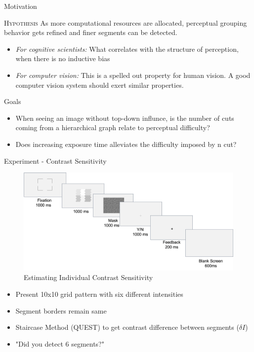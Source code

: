 \documentclass[10pt,xcolor=svgnames]{beamer} %
\begin{document}
\begin{frame}{Motivation}

\begin{exampleblock}{\textsc{Hypothesis}}
As more computational resources are allocated, perceptual grouping behavior gets refined and finer segments can be detected.
\end{exampleblock}

\begin{itemize}
    \item \textit{For cognitive scientists:} What correlates with the structure of perception, when there is no inductive bias
    \item \textit{For computer vision:} This is a spelled out property for human vision. A good computer vision system should exert similar properties.
\end{itemize}
\end{frame}

\begin{frame}{Goals}

\begin{itemize}
    \item When seeing an image without top-down influnce, is the number of cuts coming from a hierarchical graph relate to perceptual difficulty?   
    \item Does increasing exposure time alleviates the difficulty imposed by n cut?
\end{itemize}
\end{frame}


\begin{frame}{Experiment - Contrast Sensitivity}
    \begin{figure}
    \centering
        \includegraphics[width = \textwidth]{pictures/thresholdExpProcedure.png}   
    \caption{\footnotesize Estimating Individual Contrast Sensitivity}
    \end{figure}    
    \vspace{-0.5cm}
    \begin{itemize}
        \item Present 10x10 grid pattern with six different intensities
        \item Segment borders remain same
        \item Staircase Method (QUEST) to get contrast difference between segments ($\delta I$)
        \item "Did you detect 6 segments?"
    \end{itemize}
\end{frame}
\end{document}
